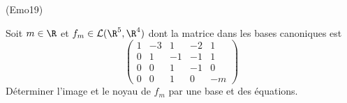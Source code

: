 \begin{tiny}(Emo19)\end{tiny} Soit $m\in \R$ et $f_m\in\mathcal{L}(\R^5,\R^4)$ dont la matrice dans les bases canoniques est
\begin{displaymath}
 \begin{pmatrix}
  1 & -3 & 1 & -2 & 1 \\ 0 & 1 & -1 & -1 & 1 \\
0 & 0 & 1 & -1 & 0 \\ 0 & 0 & 1 & 0 & -m
 \end{pmatrix}
\end{displaymath}
Déterminer l'image et le noyau de $f_m$ par une base et des équations.